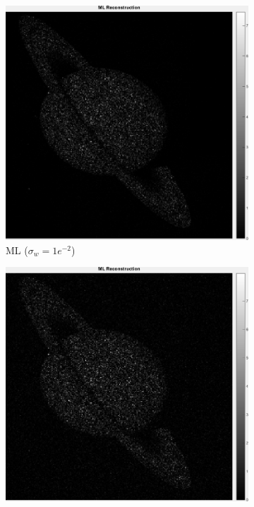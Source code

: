 \documentclass[a4paper, 11pt]{article}
\begin{document}
\begin{figure}[h]
\centering
\centering
    \begin{subfigure}[b]{0.22\textwidth}
        \includegraphics[width=\textwidth]{../Figures/MLReconstructionNoiseSigma1e-2.png}
        \caption{\tiny ML ($\sigma_w=1e^{-2}$)}
        \label{fig:ML-2}
    \end{subfigure}
    \begin{subfigure}[b]{0.22\textwidth}
        \includegraphics[width=\textwidth]{../Figures/MLReconstructionNoiseSigma1e-1.png}

\end{subfigure}
\end{figure}
\end{document}
